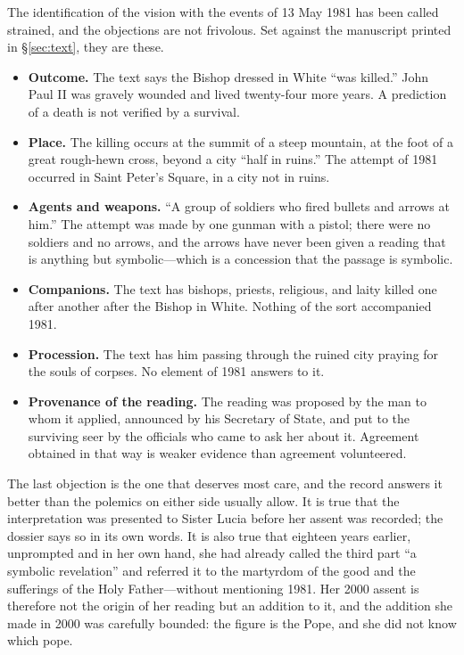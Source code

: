 The identification of the vision with the events of 13 May 1981 has
been called strained, and the objections are not frivolous. Set
against the manuscript printed in \S\ref{sec:text}, they are these.

\begin{itemize}
\item \textbf{Outcome.} The text says the Bishop dressed in White
``was killed.'' John Paul II was gravely wounded and lived
twenty-four more years. A prediction of a death is not verified by a
survival.
\item \textbf{Place.} The killing occurs at the summit of a steep
mountain, at the foot of a great rough-hewn cross, beyond a city
``half in ruins.'' The attempt of 1981 occurred in Saint Peter's
Square, in a city not in ruins.
\item \textbf{Agents and weapons.} ``A group of soldiers who fired
bullets and arrows at him.'' The attempt was made by one gunman with
a pistol; there were no soldiers and no arrows, and the arrows have
never been given a reading that is anything but symbolic---which is a
concession that the passage is symbolic.
\item \textbf{Companions.} The text has bishops, priests, religious,
and laity killed one after another after the Bishop in White. Nothing
of the sort accompanied 1981.
\item \textbf{Procession.} The text has him passing through the
ruined city praying for the souls of corpses. No element of 1981
answers to it.
\item \textbf{Provenance of the reading.} The reading was proposed by
the man to whom it applied, announced by his Secretary of State, and
put to the surviving seer by the officials who came to ask her about
it. Agreement obtained in that way is weaker evidence than agreement
volunteered.
\end{itemize}

The last objection is the one that deserves most care, and the record
answers it better than the polemics on either side usually allow. It
is true that the interpretation was presented to Sister Lucia before
her assent was recorded; the dossier says so in its own words.
It is also true that eighteen years earlier, unprompted and in her
own hand, she had already called the third part ``a symbolic
revelation'' and referred it to the martyrdom of the good and the
sufferings of the Holy Father---without mentioning 1981. Her 2000
assent is therefore not the origin of her reading but an addition to
it, and the addition she made in 2000 was carefully bounded: the
figure is the Pope, and she did not know which pope.

